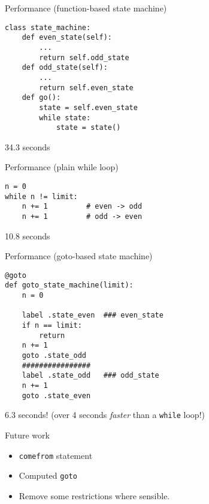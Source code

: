 \documentclass{beamer}
\begin{document}
\begin{frame}[fragile]{Performance (function-based state machine)}

\begin{verbatim}
class state_machine:
    def even_state(self):
        ...
        return self.odd_state
    def odd_state(self):
        ...
        return self.even_state
    def go():
        state = self.even_state
        while state:
            state = state()
\end{verbatim}
34.3 seconds
\end{frame}


\begin{frame}[fragile]{Performance (plain while loop)}
\begin{verbatim}
n = 0
while n != limit:
    n += 1         # even -> odd
    n += 1         # odd -> even
\end{verbatim}
10.8 seconds
\end{frame}

\begin{frame}[fragile]{Performance (goto-based state machine)}
\begin{verbatim}
@goto
def goto_state_machine(limit):
    n = 0

    label .state_even  ### even_state
    if n == limit:
        return
    n += 1
    goto .state_odd
    ################
    label .state_odd   ### odd_state
    n += 1
    goto .state_even
\end{verbatim}
6.3 seconds!  (over 4 seconds \emph{faster} than a \verb!while! loop!)
\end{frame}

\begin{frame}[fragile]{Future work}

\begin{itemize}
\item \verb!comefrom! statement
\item Computed \verb!goto!
\item Remove some restrictions where sensible.
\end{itemize}

\end{frame}
\end{document}
